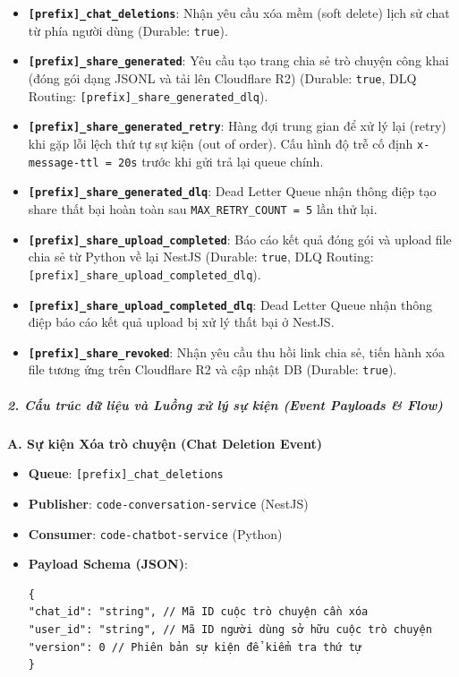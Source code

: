 \begin{itemize}
\item \textbf{\texttt{[prefix]\_chat\_deletions}}: Nhận yêu cầu xóa mềm (soft delete) lịch sử chat từ phía người dùng (Durable: \texttt{true}).

\item \textbf{\texttt{[prefix]\_share\_generated}}: Yêu cầu tạo trang chia sẻ trò chuyện công khai (đóng gói dạng JSONL và tải lên Cloudflare R2) (Durable: \texttt{true}, DLQ Routing: \texttt{[prefix]\_share\_generated\_dlq}).

\item \textbf{\texttt{[prefix]\_share\_generated\_retry}}: Hàng đợi trung gian để xử lý lại (retry) khi gặp lỗi lệch thứ tự sự kiện (out of order). Cấu hình độ trễ cố định \texttt{x-message-ttl = 20s} trước khi gửi trả lại queue chính.

\item \textbf{\texttt{[prefix]\_share\_generated\_dlq}}: Dead Letter Queue nhận thông điệp tạo share thất bại hoàn toàn sau \texttt{MAX\_RETRY\_COUNT = 5} lần thử lại.

\item \textbf{\texttt{[prefix]\_share\_upload\_completed}}: Báo cáo kết quả đóng gói và upload file chia sẻ từ Python về lại NestJS (Durable: \texttt{true}, DLQ Routing: \texttt{[prefix]\_share\_upload\_completed\_dlq}).

\item \textbf{\texttt{[prefix]\_share\_upload\_completed\_dlq}}: Dead Letter Queue nhận thông điệp báo cáo kết quả upload bị xử lý thất bại ở NestJS.

\item \textbf{\texttt{[prefix]\_share\_revoked}}: Nhận yêu cầu thu hồi link chia sẻ, tiến hành xóa file tương ứng trên Cloudflare R2 và cập nhật DB (Durable: \texttt{true}).
\end{itemize}

\subparagraph{2. Cấu trúc dữ liệu và Luồng xử lý sự kiện (Event Payloads \& Flow)}

\textbf{A. Sự kiện Xóa trò chuyện (Chat Deletion Event)}
\begin{itemize}
\item \textbf{Queue}: \texttt{[prefix]\_chat\_deletions}
\item \textbf{Publisher}: \texttt{code-conversation-service} (NestJS)
\item \textbf{Consumer}: \texttt{code-chatbot-service} (Python)
\item \textbf{Payload Schema (JSON)}:
\begin{verbatim}
{
"chat_id": "string", // Mã ID cuộc trò chuyện cần xóa
"user_id": "string", // Mã ID người dùng sở hữu cuộc trò chuyện
"version": 0 // Phiên bản sự kiện để kiểm tra thứ tự
}
\end{verbatim}
\end{itemize}

